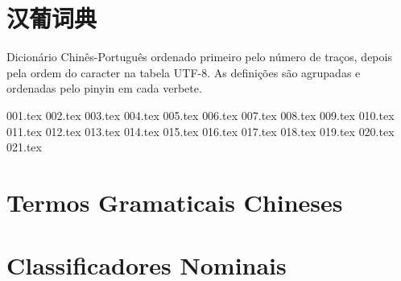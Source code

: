 \documentclass[a4paper,9pt,twoside,openany]{memoir}
\begin{document}



\clearpage
\pagestyle{empty}
\tableofcontents

\clearpage
\pagestyle{empty}
\chapter{汉葡词典}

%
%

Dicionário Chinês-Português ordenado primeiro pelo número de traços,
depois pela ordem do caracter na tabela UTF-8.  As definições são
agrupadas e ordenadas pelo pinyin em cada verbete.

\clearpage
\pagestyle{dicionario}
\begin{multicols}{2}
{001.tex}
{002.tex}
{003.tex}
{004.tex}
{005.tex}
{006.tex}
{007.tex}
{008.tex}
{009.tex}
{010.tex}
{011.tex}
{012.tex}
{013.tex}
{014.tex}
{015.tex}
{016.tex}
{017.tex}
{018.tex}
{019.tex}
{020.tex}
{021.tex}
\end{multicols}

\clearpage
\pagestyle{plain}
\chapter{Termos Gramaticais Chineses}


\clearpage
\pagestyle{plain}
\chapter{Classificadores Nominais}

\end{document}
